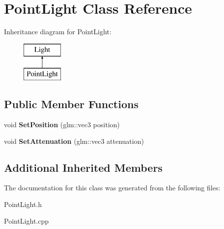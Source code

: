 \hypertarget{class_point_light}{}\section{Point\+Light Class Reference}
\label{class_point_light}
Inheritance diagram for Point\+Light\+:\begin{figure}[H]
\begin{center}
\leavevmode
\includegraphics[height=2.000000cm]{class_point_light}
\end{center}
\end{figure}
\subsection*{Public Member Functions}
\begin{DoxyCompactItemize}
\item 
\mbox{\label{class_point_light_a54075ad125124b48c3ae0de94f8846ec}} 
void {\bfseries Set\+Position} (glm\+::vec3 position)
\item 
\mbox{\label{class_point_light_a5dee3d9dfd33530fd0b5c4e3caa733a5}} 
void {\bfseries Set\+Attenuation} (glm\+::vec3 attenuation)
\end{DoxyCompactItemize}
\subsection*{Additional Inherited Members}


The documentation for this class was generated from the following files\+:\begin{DoxyCompactItemize}
\item 
Point\+Light.\+h\item 
Point\+Light.\+cpp\end{DoxyCompactItemize}
